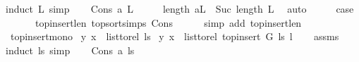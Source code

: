 \begin{isabellebody}
%
\endisadelimproof
%
\isatagproof
{}\isamarkupfalse%
{\isacharparenleft}{\kern0pt}induct\ L{\isacharcomma}{\kern0pt}\ simp{\isacharparenright}{\kern0pt}\isanewline
\ \ \isamarkupfalse%
\ {\isacharparenleft}{\kern0pt}Cons\ a\ L{\isacharparenright}{\kern0pt}\isanewline
\ \ \isamarkupfalse%
\ \isamarkupfalse%
\ {\isachardoublequoteopen}length\ {\isacharparenleft}{\kern0pt}a{\isacharhash}{\kern0pt}L{\isacharparenright}{\kern0pt}\ {\isacharequal}{\kern0pt}\ Suc\ {\isacharparenleft}{\kern0pt}length\ L{\isacharparenright}{\kern0pt}{\isachardoublequoteclose}\ \isamarkupfalse%
\ auto\isanewline
\ \ \isamarkupfalse%
\ \isamarkupfalse%
\ {\isacharquery}{\kern0pt}case\ \isamarkupfalse%
\isanewline
\ \ \ \ \ \ top{\isacharunderscore}{\kern0pt}insert{\isacharunderscore}{\kern0pt}len\ top{\isacharunderscore}{\kern0pt}sort{\isachardot}{\kern0pt}simps{\isacharparenleft}{\kern0pt}{}{\isacharparenright}{\kern0pt}\ Cons\isanewline
\ \ \ \ \isamarkupfalse%
\ {\isacharparenleft}{\kern0pt}simp\ add{\isacharcolon}{\kern0pt}\ top{\isacharunderscore}{\kern0pt}insert{\isacharunderscore}{\kern0pt}len{\isacharparenright}{\kern0pt}\ \ \isanewline
{}\isamarkupfalse%
%
\endisatagproof
{\isafoldproof}%
%
\isadelimproof
\isanewline
%
\endisadelimproof
\isanewline
{}\isamarkupfalse%
\ top{\isacharunderscore}{\kern0pt}insert{\isacharunderscore}{\kern0pt}mono{\isacharcolon}{\kern0pt}\isanewline
{}\ {\isachardoublequoteopen}{\isacharparenleft}{\kern0pt}y{\isacharcomma}{\kern0pt}\ x{\isacharparenright}{\kern0pt}\ {\isasymin}\ list{\isacharunderscore}{\kern0pt}to{\isacharunderscore}{\kern0pt}rel\ ls{\isachardoublequoteclose}\isanewline
{}\ {\isachardoublequoteopen}{\isacharparenleft}{\kern0pt}y{\isacharcomma}{\kern0pt}\ x{\isacharparenright}{\kern0pt}\ {\isasymin}\ list{\isacharunderscore}{\kern0pt}to{\isacharunderscore}{\kern0pt}rel\ {\isacharparenleft}{\kern0pt}top{\isacharunderscore}{\kern0pt}insert\ G\ ls\ l{\isacharparenright}{\kern0pt}{\isachardoublequoteclose}\isanewline
%
\isadelimproof
\ \ %
\endisadelimproof
%
\isatagproof
{}\isamarkupfalse%
\ assms\ \isanewline
{}\isamarkupfalse%
{\isacharparenleft}{\kern0pt}induct\ ls{\isacharcomma}{\kern0pt}\ simp{\isacharparenright}{\kern0pt}\isanewline
\ \ \isamarkupfalse%
\ {\isacharparenleft}{\kern0pt}Cons\ a\ ls{\isacharparenright}{\kern0pt}\isanewline
\ \ \isamarkupfalse%

\end{isabellebody}
